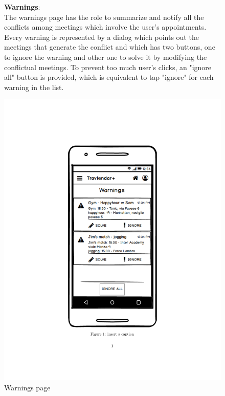	\begin{figure}
			\begin{flushleft}
			\textbf{Warnings}:\\
			The warnings page has the role to summarize and notify all the conflicts among meetings which involve the user's appointments. Every warning is represented by a dialog which points out the meetings that generate the conflict and which has two buttons, one to ignore the warning and other one to solve it by modifying the conflictual meetings. 
			To prevent too much user's clicks, an "ignore all" button is provided, which is equivalent to tap "ignore" for each warning in the list. 
		\end{flushleft}
		\centering
		\includegraphics[width=0.6\linewidth]{mockups/Warnings}
		\caption{Warnings page}
		\label{fig:warnings}
	\end{figure}
\clearpage

